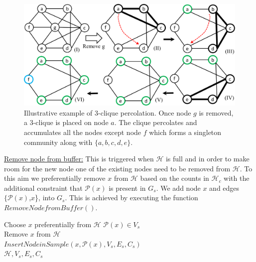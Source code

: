 



\begin{figure}[!h]
\centering
\includegraphics[width=0.8\columnwidth]{./texfiles/Chapter_2/figures/percolation}
\caption{Illustrative example of 3-clique percolation. Once node $g$ is removed, a 3-clique is placed on node $a$. The clique  percolates and accumulates all the nodes except node $f$ which forms a singleton community along with $\{a,b,c,d,e\}$.}\label{fig_percolation} 
\end{figure}


\noindent\underline{Remove node from buffer:} This is triggered when $\mathcal{H}$ is full and in order to make room for the new node one of the existing nodes need to be removed from $\mathcal{H}$. To this aim 
we preferentially remove $x$ from $\mathcal{H}$ based on the counts in $\mathcal{H}_c$ with the 
additional constraint that $\mathcal{P}(x)$ is present in $G_s$. We add node $x$ and edges $\{\mathcal{P}(x)$,$x$\}, into $G_s$. This is achieved by executing the function $RemoveNodefromBuffer()$. 

\begin{function3}[!ht]
 \caption{\small $RemoveNodefromBuffer(\mathcal{H},V_s,E_s,C_s)$}
 \label{removenodebuffer}
 Choose $x$ preferentially from $\mathcal{H}$ $\mathcal{P}(x) \in V_s$ \\
 Remove $x$ from $\mathcal{H}$ \\
 $InsertNodeinSample(x,\mathcal{P}(x),V_s,E_s,C_s)$ \\
 \Return  $\mathcal{H},V_s,E_s,C_s$ 
\end{function3}

